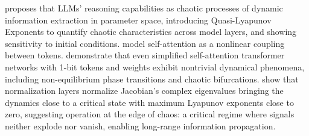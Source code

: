 \documentclass[a4paper,12pt]{article}
\begin{document}
\cite{li2025cognitive_activation} proposes that LLMs' reasoning capabilities as chaotic processes of dynamic information extraction in parameter space, introducing Quasi-Lyapunov Exponents to quantify chaotic characteristics across model layers, and showing sensitivity to initial conditions.
\cite{geshkovski2025mathematicalperspectivetransformers} model self-attention as a nonlinear coupling between tokens.
\cite{dynamicalmeanfieldtheoryselfattention} demonstrate that even simplified self-attention transformer networks with 1-bit tokens and weights exhibit nontrivial dynamical phenomena, including non-equilibrium phase transitions and chaotic bifurcations. 
\cite{tomihari2025recurrent_self_attention_dynamics} show that normalization layers normalize Jacobian's complex eigenvalues bringing the dynamics close to a critical state with maximum Lyapunov exponents close to zero, suggesting operation at the edge of chaos: a critical regime where signals neither explode nor vanish, enabling long-range information propagation. %
\end{document}
